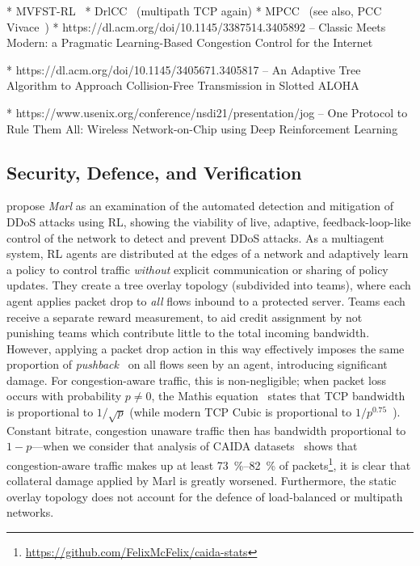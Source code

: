 * MVFST-RL~\parencite{DBLP:journals/corr/abs-1910-04054}
* DrlCC~\parencite{DBLP:journals/jsac/XuTYWX19} (multipath TCP again)
* MPCC~\parencite{DBLP:conf/conext/GiladSGRS20} (see also, PCC Vivace~\parencite{DBLP:conf/nsdi/DongLZGS15,DBLP:conf/nsdi/DongMZAGGS18})
* https://dl.acm.org/doi/10.1145/3387514.3405892 -- Classic Meets Modern: a Pragmatic Learning-Based Congestion Control for the Internet

* https://dl.acm.org/doi/10.1145/3405671.3405817 -- An Adaptive Tree Algorithm to Approach Collision-Free Transmission in Slotted ALOHA

* https://www.usenix.org/conference/nsdi21/presentation/jog -- One Protocol to Rule Them All: Wireless Network-on-Chip using Deep Reinforcement Learning

\subsection{Security, Defence, and Verification}
\textcite{DBLP:journals/eaai/MalialisK15} propose \emph{Marl} as an examination of the automated detection and mitigation of DDoS attacks using RL, showing the viability of live, adaptive, feedback-loop-like control of the network to detect and prevent DDoS attacks.
As a multiagent system, RL agents are distributed at the edges of a network and adaptively learn a policy to control traffic \emph{without} explicit communication or sharing of policy updates.
They create a tree overlay topology (subdivided into teams), where each agent applies packet drop to \emph{all} flows inbound to a protected server.
Teams each receive a separate reward measurement, to aid credit assignment by not punishing teams which contribute little to the total incoming bandwidth.
However, applying a packet drop action in this way effectively imposes the same proportion of \emph{pushback}~\cite{DBLP:journals/ccr/MahajanBFIPS02a} on all flows seen by an agent, introducing significant damage.
For congestion-aware traffic, this is non-negligible; when packet loss occurs with probability $p\ne0$, the Mathis equation~\cite{DBLP:journals/ccr/MathisSMO97} states that TCP bandwidth is proportional to $1/\sqrt{p}$ (while modern TCP Cubic is proportional to $1/p^{0.75}$~\cite{rfc8312}).
Constant bitrate, congestion unaware traffic then has bandwidth proportional to $1 - p$---when we consider that analysis of CAIDA datasets~\cite{caida-2018-passive} shows that congestion-aware traffic makes up at least \SIrange{73}{82}{\percent} of packets\footnote{\url{https://github.com/FelixMcFelix/caida-stats}}, it is clear that collateral damage applied by Marl is greatly worsened.
Furthermore, the static overlay topology does not account for the defence of load-balanced or multipath networks.

